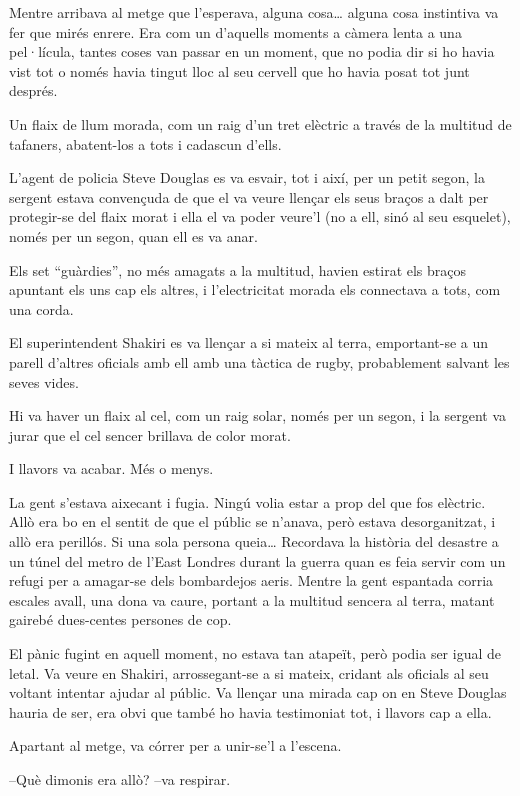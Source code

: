 Mentre arribava al metge que l'esperava, alguna cosa\ldots{} alguna cosa
instintiva va fer que mirés enrere. Era com un d'aquells moments a
càmera lenta a una pel·lícula, tantes coses van passar en un moment, que
no podia dir si ho havia vist tot o només havia tingut lloc al seu
cervell que ho havia posat tot junt després.

Un flaix de llum morada, com un raig d'un tret elèctric a través de la
multitud de tafaners, abatent-los a tots i cadascun d'ells.

L'agent de policia Steve Douglas es va esvair, tot i així, per un petit
segon, la sergent estava convençuda de que el va veure llençar els seus
braços a dalt per protegir-se del flaix morat i ella el va poder veure'l
(no a ell, sinó al seu esquelet), només per un segon, quan ell es va
anar.

Els set ``guàrdies'', no més amagats a la multitud, havien estirat els
braços apuntant els uns cap els altres, i l'electricitat morada els
connectava a tots, com una corda.

El superintendent Shakiri es va llençar a si mateix al terra,
emportant-se a un parell d'altres oficials amb ell amb una tàctica de
rugby, probablement salvant les seves vides.

Hi va haver un flaix al cel, com un raig solar, només per un segon, i la
sergent va jurar que el cel sencer brillava de color morat.

I llavors va acabar. Més o menys.

La gent s'estava aixecant i fugia. Ningú volia estar a prop del que fos
elèctric. Allò era bo en el sentit de que el públic se n'anava, però
estava desorganitzat, i allò era perillós. Si una sola persona
queia\ldots{} Recordava la història del desastre a un túnel del metro de
l'East Londres durant la guerra quan es feia servir com un refugi per a
amagar-se dels bombardejos aeris. Mentre la gent espantada corria
escales avall, una dona va caure, portant a la multitud sencera al
terra, matant gairebé dues-centes persones de cop.

El pànic fugint en aquell moment, no estava tan atapeït, però podia ser
igual de letal. Va veure en Shakiri, arrossegant-se a si mateix, cridant
als oficials al seu voltant intentar ajudar al públic. Va llençar una
mirada cap on en Steve Douglas hauria de ser, era obvi que també ho
havia testimoniat tot, i llavors cap a ella.

Apartant al metge, va córrer per a unir-se'l a l'escena.

--Què dimonis era allò? --va respirar.

